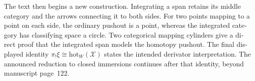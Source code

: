\begin{otherlanguage}{english}
The text then begins a new construction. Integrating a span retains its middle category and the arrows connecting it to both sides. For two points mapping to a point on each side, the ordinary pushout is a point, whereas the integrated category has classifying space a circle. Two categorical mapping cylinders give a direct proof that the integrated span models the homotopy pushout. The final displayed identity $\pi_!\xi\cong\mathrm{hot}_W(\mathscr X)$ states the intended derivator interpretation. The announced reduction to closed immersions continues after that identity, beyond manuscript page~122.

\endgroup
\end{otherlanguage}
\dgrchunkend
